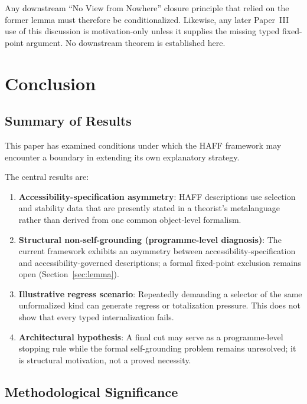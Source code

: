 \documentclass[12pt,a4paper]{article}
\begin{document}
Any downstream ``No View from Nowhere'' closure principle that relied on the former lemma must therefore be conditionalized.  Likewise, any later Paper~III use of this discussion is motivation-only unless it supplies the missing typed fixed-point argument.  No downstream theorem is established here.

\section{Conclusion}
\label{sec:conclusion}

\subsection{Summary of Results}

This paper has examined conditions under which the HAFF framework may encounter a boundary in extending its own explanatory strategy.

The central results are:

\begin{enumerate}
    \item \textbf{Accessibility-specification asymmetry}: HAFF descriptions use selection and stability data that are presently stated in a theorist's metalanguage rather than derived from one common object-level formalism.
    
    \item \textbf{Structural non-self-grounding (programme-level diagnosis)}: The current framework exhibits an asymmetry between accessibility-specification and accessibility-governed descriptions; a formal fixed-point exclusion remains open (Section~\ref{sec:lemma}).
    
    \item \textbf{Illustrative regress scenario}: Repeatedly demanding a selector of the same unformalized kind can generate regress or totalization pressure. This does not show that every typed internalization fails.
    
    \item \textbf{Architectural hypothesis}: A final cut may serve as a programme-level stopping rule while the formal self-grounding problem remains unresolved; it is structural motivation, not a proved necessity.
\end{enumerate}

\subsection{Methodological Significance}
\end{document}
